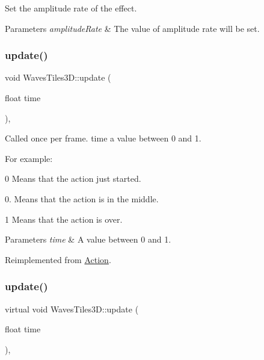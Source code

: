 Set the amplitude rate of the effect. 


\begin{DoxyParams}{Parameters}
{\em amplitude\+Rate} & The value of amplitude rate will be set. \\
\hline
\end{DoxyParams}
\mbox{\label{classWavesTiles3D_a02aeb1343fa7e6fd530c35f805d49665}} 
\subsubsection{\texorpdfstring{update()}{update()}\hspace{0.1cm}{\footnotesize\ttfamily [1/2]}}
{\footnotesize\ttfamily void Waves\+Tiles3\+D\+::update (\begin{DoxyParamCaption}\item[{float}]{time }\end{DoxyParamCaption})\hspace{0.3cm}{\ttfamily [override]}, {\ttfamily [virtual]}}

Called once per frame. time a value between 0 and 1.

For example\+:
\begin{DoxyItemize}
\item 0 Means that the action just started.
\item 0. Means that the action is in the middle.
\item 1 Means that the action is over.
\end{DoxyItemize}


\begin{DoxyParams}{Parameters}
{\em time} & A value between 0 and 1. \\
\hline
\end{DoxyParams}


Reimplemented from \hyperlink{classAction_a937e646e63915e33ad05ba149bfcf239}{Action}.

\mbox{\label{classWavesTiles3D_a7418270658659552df80826ed4904ec6}} 
\subsubsection{\texorpdfstring{update()}{update()}\hspace{0.1cm}{\footnotesize\ttfamily [2/2]}}
{\footnotesize\ttfamily virtual void Waves\+Tiles3\+D\+::update (\begin{DoxyParamCaption}\item[{float}]{time }\end{DoxyParamCaption})\hspace{0.3cm}{\ttfamily [override]}, {\ttfamily [virtual]}}

